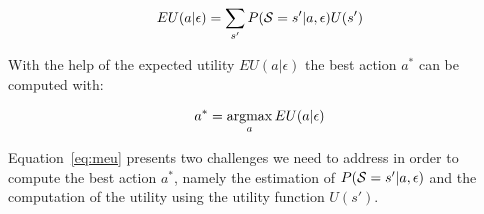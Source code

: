 \documentclass[conference]{IEEEtran}
\begin{document}
\begin{eqnarray}
 EU(a|\epsilon) = \sum_{s'}P(\S = s'|a, \epsilon)U(s')
\end{eqnarray}

With the help of the expected utility $EU(a|\epsilon)$ the best action $a^*$ can be computed with:

\begin{eqnarray}\label{eq:meu}
 a^* = \argmax_a EU(a|\epsilon)
\end{eqnarray}

Equation~\ref{eq:meu} presents two challenges we need to address in order to compute the best action $a^*$, namely the estimation of $P(\S = s'|a, \epsilon)$ and the computation of the utility using the utility function $U(s')$.


% 
% 
% 
% 
% 

\end{document}
